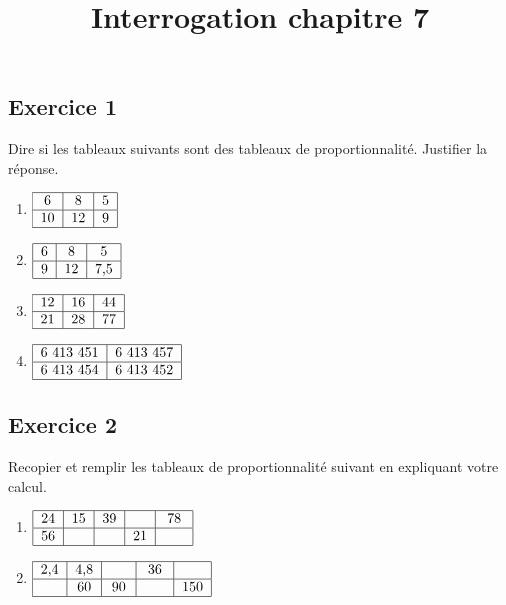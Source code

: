 \documentclass[14pt]{extreport}
\title{Interrogation chapitre 7}
\date{}
\theoremstyle{plain}
\begin{document}
\subsection*{Exercice 1}	
	
Dire si les tableaux suivants sont des tableaux de proportionnalité. Justifier la réponse. 

\begin{enumerate}

\item $\begin{tabular}{|c|c|c|}
\hline 
6 & 8 & 5 \\
\hline 
10 & 12 & 9\\
\hline
\end{tabular}$

\item $\begin{tabular}{|c|c|c|}
\hline 
6 & 8 & 5 \\
\hline 
9 & 12 & 7,5\\
\hline
\end{tabular}$

\item $\begin{tabular}{|c|c|c|}
\hline 
12 & 16 & 44 \\
\hline 
21 & 28 & 77\\
\hline
\end{tabular}$

\item $\begin{tabular}{|c|c|}
\hline 
 6 413 451 &  6 413 457 \\
\hline 
6 413 454 & 6 413 452 \\
\hline
\end{tabular}$

\end{enumerate}	
	
	
	\subsection*{Exercice 2 }
	
	Recopier et remplir les tableaux de proportionnalité suivant en expliquant votre calcul. 
	
	\begin{enumerate}
	
\item $\begin{tabular}{|c|c|c|c|c|}
\hline 
24 & 15 & 39 & \phantom{9} & 78 \\
\hline 
56 & \phantom{35} & \phantom{91} & 21 & \phantom{182}\\
\hline
\end{tabular}$

\item $\begin{tabular}{|c|c|c|c|c|}
\hline 
2,4 & 4,8 & \phantom{7,2} & 36 & \phantom{12} \\
\hline 
\phantom{30} & 60 & 90 & \phantom{450} & 150\\
\hline
\end{tabular}$

\end{enumerate}
    
\end{document}

